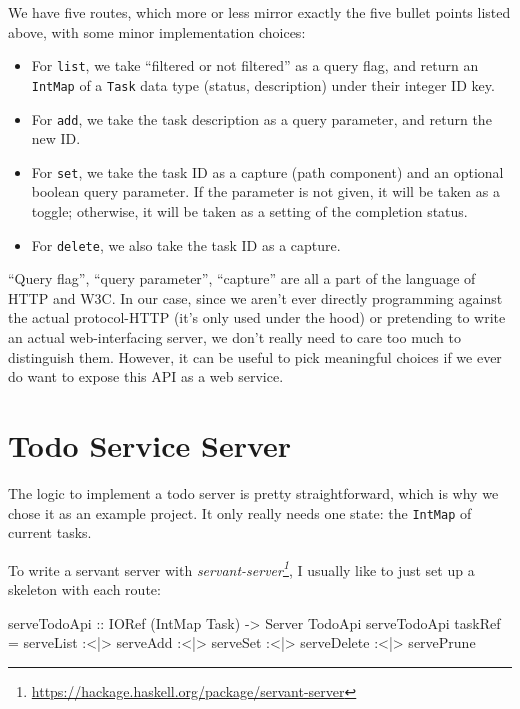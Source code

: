 \documentclass[]{article}
\newenvironment{Shaded}{}{}
\newcommand{\DataTypeTok}[1]{\textcolor[rgb]{0.56,0.13,0.00}{#1}}
\newcommand{\NormalTok}[1]{#1}
\newcommand{\OperatorTok}[1]{\textcolor[rgb]{0.40,0.40,0.40}{#1}}
\newcommand{\OtherTok}[1]{\textcolor[rgb]{0.00,0.44,0.13}{#1}}
\renewcommand{\href}[2]{#2\footnote{\url{#1}}}
\begin{document}
We have five routes, which more or less mirror exactly the five bullet points
listed above, with some minor implementation choices:

\begin{itemize}
\tightlist
\item
  For \texttt{list}, we take ``filtered or not filtered'' as a query flag, and
  return an \texttt{IntMap} of a \texttt{Task} data type (status, description)
  under their integer ID key.
\item
  For \texttt{add}, we take the task description as a query parameter, and
  return the new ID.
\item
  For \texttt{set}, we take the task ID as a capture (path component) and an
  optional boolean query parameter. If the parameter is not given, it will be
  taken as a toggle; otherwise, it will be taken as a setting of the completion
  status.
\item
  For \texttt{delete}, we also take the task ID as a capture.
\end{itemize}

``Query flag'', ``query parameter'', ``capture'' are all a part of the language
of HTTP and W3C. In our case, since we aren't ever directly programming against
the actual protocol-HTTP (it's only used under the hood) or pretending to write
an actual web-interfacing server, we don't really need to care too much to
distinguish them. However, it can be useful to pick meaningful choices if we
ever do want to expose this API as a web service.

\hypertarget{todo-service-server}{%
\section{Todo Service Server}\label{todo-service-server}}

The logic to implement a todo server is pretty straightforward, which is why we
chose it as an example project. It only really needs one state: the
\texttt{IntMap} of current tasks.

To write a servant server with
\emph{\href{https://hackage.haskell.org/package/servant-server}{servant-server}},
I usually like to just set up a skeleton with each route:

\begin{Shaded}
\begin{Highlighting}[]
\OtherTok{serveTodoApi ::} \DataTypeTok{IORef}\NormalTok{ (}\DataTypeTok{IntMap} \DataTypeTok{Task}\NormalTok{) }\OtherTok{{-}>} \DataTypeTok{Server} \DataTypeTok{TodoApi}
\NormalTok{serveTodoApi taskRef }\OtherTok{=}\NormalTok{ serveList}
                  \OperatorTok{:<|>}\NormalTok{ serveAdd}
                  \OperatorTok{:<|>}\NormalTok{ serveSet}
                  \OperatorTok{:<|>}\NormalTok{ serveDelete}
                  \OperatorTok{:<|>}\NormalTok{ servePrune}
\end{Highlighting}
\end{Shaded}
\end{document}
